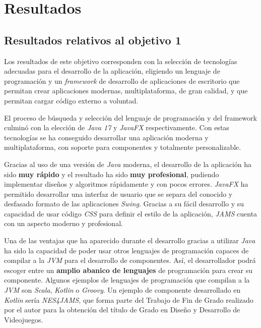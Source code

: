 \chapter{Resultados}\label{ch:resultados}


\section{Resultados relativos al objetivo 1}\label{sec:resultados-relativos-al-objetivo-1}

Los resultados de este objetivo corresponden con la selección de
tecnologías adecuadas para el desarrollo de la aplicación,
eligiendo un lenguaje de programación y un \textit{framework} de
desarrollo de aplicaciones de escritorio que permitan crear
aplicaciones modernas, multiplataforma, de gran calidad,
y que permitan cargar código externo a voluntad.

El proceso de búsqueda y selección del lenguaje de programación y
del framework culminó con la elección de \textit{Java 17}
y \textit{JavaFX} respectivamente.
Con estas tecnologías se ha conseguido desarrollar una aplicación
moderna y multiplataforma, con soporte para componentes y totalmente
personalizable.

Gracias al uso de una versión de \textit{Java} moderna,
el desarrollo de la aplicación ha sido \textbf{muy rápido} y el resultado
ha sido \textbf{muy profesional}, pudiendo implementar diseños y
algoritmos rápidamente y con pocos errores.
\textit{JavaFX} ha permitido desarrollar una interfaz de usuario
que se separa del conocido y desfasado formato de las aplicaciones
\textit{Swing}.
Gracias a su fácil desarrollo y su capacidad de usar código
\textit{CSS} para definir el estilo de la aplicación, \textit{JAMS}
cuenta con un aspecto moderno y profesional.

Una de las ventajas que ha aparecido durante el
desarrollo gracias a utilizar \textit{Java} ha sido la
capacidad de poder usar otros lenguajes de programación capaces
de compilar a la \textit{JVM} para el desarrollo de componentes.
Así, el desarrollador podrá escoger entre un \textbf{amplio abanico de lenguajes}
de programación para crear su componente.
Algunos ejemplos de lenguajes de programación que compilan a la \textit{JVM}
son \textit{Scala}, \textit{Kotlin} o \textit{Groovy}.
Un ejemplo de componente desarrollado en \textit{Kotlin} sería
\textit{NES4JAMS}, que forma parte del Trabajo de Fin de Grado
realizado por el autor para la obtención del título de Grado en
Diseño y Desarrollo de Videojuegos.

